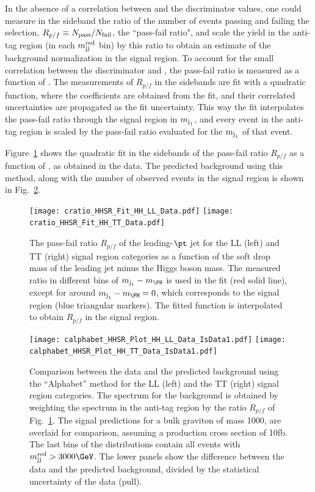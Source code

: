 In the absence of a correlation between \mjone and the \Hbbt
discriminator values, one could measure in the \mjone sideband the
ratio of the number of events passing and failing the \Hbbt selection,
$R_{p/f} \equiv N_{\rm pass}/N_{\rm fail}$, \ie the
``pass-fail ratio", and scale the yield in the anti-tag region (in
each $m_{\text{jj}}^{\text{red}}$ bin) by this ratio to obtain an estimate of the
background normalization in the signal region. To account for the
small correlation between the \Hbbt discriminator and \mjone, the
pass-fail ratio is measured as a function of \mjone. The measurements
of $R_{p/f}$ in the \mjone sidebands are fit with a quadratic
function, where the coefficients are obtained from the fit, and their
correlated uncertainties are propagated as the fit uncertainty. This
way the fit interpolates the pass-fail ratio through the signal region
in $m_{\text{j}_{1}}$, and every event in the anti-tag region is scaled by the
pass-fail ratio evaluated for the $m_{\text{j}_{1}}$ of that event. 

Figure~\ref{fig:Alphabet_Rpf_TT_LL} shows the quadratic fit in the
\mjone sidebands of the pass-fail ratio $R_{p/f}$ as a function of
\mjone, as obtained in the data. The predicted background using this
method, along with the number of observed events in the signal region
is shown in Fig.~\ref{fig:Alphabet_Bkg_TT_LL}.

\begin{figure}[h]
\centering
\texttt{[image: cratio\_HHSR\_Fit\_HH\_LL\_Data.pdf]}
\texttt{[image: cratio\_HHSR\_Fit\_HH\_TT\_Data.pdf]}
\caption{The pass-fail ratio $R_{p/f}$ of the leading-$\pt$ jet for the LL (left) and TT (right) signal region categories as a function of the soft drop mass of the leading jet \mjone minus the Higgs boson mass. The measured ratio in different bins of $\mjone - \mH$ is used in the fit (red solid line), except for around $\mjone - \mH = 0$, which corresponds to the signal region (blue triangular markers). The fitted function is interpolated to obtain $R_{p/f}$ in the signal region.}
\label{fig:Alphabet_Rpf_TT_LL}
\end{figure}

\begin{figure}[h]
\centering
\texttt{[image: calphabet\_HHSR\_Plot\_HH\_LL\_Data\_IsData1.pdf]}
\texttt{[image: calphabet\_HHSR\_Plot\_HH\_TT\_Data\_IsData1.pdf]}
  \caption{Comparison between the data and the predicted background using the ``Alphabet'' method for the LL (left) and the TT (right) signal region categories. The \mjjs spectrum for the background is obtained by weighting the \mjjs spectrum in the anti-tag region by the ratio $R_{p/f}$  of Fig.~\ref{fig:Alphabet_Rpf_TT_LL}. The signal predictions for a bulk graviton of mass 1000\GeV, are overlaid for comparison, assuming a production cross section of 10\unit{fb}. The last bins of the distributions contain all events with $\mjjs > 3000\GeV$. The lower panels show the difference between the data and the predicted background, divided by the statistical uncertainty of the data (pull).} 
\label{fig:Alphabet_Bkg_TT_LL}
\end{figure}

